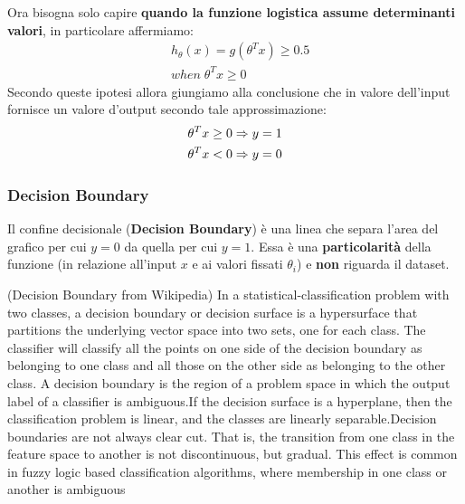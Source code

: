 Ora bisogna solo capire \textbf{quando la funzione logistica assume determinanti valori}, in particolare affermiamo:
\begin{align*}& h_\theta(x) = g(\theta^T x) \geq 0.5 \\& when \; \theta^T x \geq 0\end{align*}
Secondo queste ipotesi allora giungiamo alla conclusione che in valore dell'input fornisce un valore d'output secondo tale approssimazione:
\begin{align*}& \theta^T x \geq 0 \Rightarrow y = 1 \\& \theta^T x < 0 \Rightarrow y = 0 \newline\end{align*}
\subsubsection{Decision Boundary}
Il confine decisionale (\textbf{Decision Boundary}) è una linea che separa l'area del grafico per cui $y=0$ da quella per cui $y=1$. Essa è una \textbf{particolarità} della funzione (in relazione all'input $x$ e ai valori fissati $\theta_i$) e \textbf{non} riguarda il dataset.
\begin{definizione}(Decision Boundary from Wikipedia)
  In a statistical-classification problem with two classes, a decision boundary \cite{ConfineDecisionale} or decision surface is a hypersurface that partitions the underlying vector space into two sets, one for each class. The classifier will classify all the points on one side of the decision boundary as belonging to one class and all those on the other side as belonging to the other class. A decision boundary is the region of a problem space in which the output label of a classifier is ambiguous.If the decision surface is a hyperplane, then the classification problem is linear, and the classes are linearly separable.Decision boundaries are not always clear cut. That is, the transition from one class in the feature space to another is not discontinuous, but gradual. This effect is common in fuzzy logic based classification algorithms, where membership in one class or another is ambiguous
\end{definizione}
